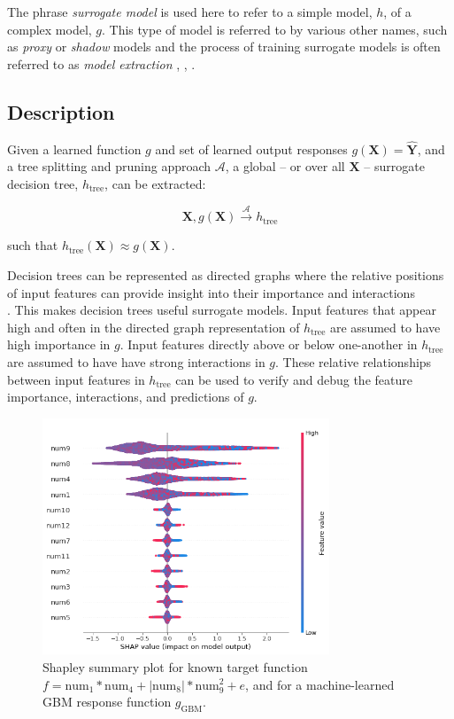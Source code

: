 \documentclass{article}
\begin{document}
The phrase \textit{surrogate model} is used here to refer to a simple model, $h$, of a complex model, $g$. This type of model is referred to by various other names, such as \textit{proxy} or \textit{shadow} models and the process of training surrogate models is often referred to as \textit{model extraction} \cite{dt_surrogate1}, \cite{ff_interpretability},  \cite{dt_surrogate2}. 

\subsection{Description}

Given a learned function $g$ and set of learned output responses $g(\mathbf{X}) = \mathbf{\hat{Y}}$, and a tree splitting and pruning approach $\mathcal{A}$, a global -- or over all $\mathbf{X}$ -- surrogate decision tree, $h_{\text{tree}}$, can be extracted: 

\begin{equation}
\mathbf{X}, g(\mathbf{X}) \xrightarrow{\mathcal{A}} h_{\text{tree}}
\end{equation}

such that $h_{\text{tree}}(\mathbf{X}) \approx g(\mathbf{X})$. 

Decision trees can be represented as directed graphs where the relative positions of input features can provide insight into their importance and interactions \\ \cite{cart}. This makes decision trees useful surrogate models. Input features that appear high and often in the directed graph representation of $h_{\text{tree}}$ are assumed to have high importance in $g$. Input features directly above or below one-another in $h_{\text{tree}}$ are assumed to have have strong interactions in $g$. These relative relationships between input features in $h_{\text{tree}}$ can be used to verify and debug the feature importance, interactions, and predictions of $g$.

\begin{figure}
	\begin{center}
		\includegraphics[height=200pt]{img/figure_2.png}
		\caption{Shapley summary plot for known target function $f = \text{num} _1 * \text{num}_4 + |\text{num}_8| * \text{num}_9^2 + e$, and for a machine-learned GBM response function $g_{\text{GBM}}$.}
		\label{fig:global_shapley}
	\end{center}
\end{figure}
\end{document}
